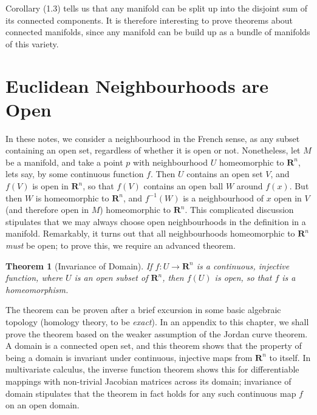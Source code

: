 \documentclass[12pt]{report}
\theoremstyle{plain}
\newtheorem{theorem}{Theorem}[chapter]
\theoremstyle{definition}
\begin{document}
Corollary (1.3) tells us that any manifold can be split up into the disjoint sum of its connected components. It is therefore interesting to prove theorems about connected manifolds, since any manifold can be build up as a bundle of manifolds of this variety.

\section{Euclidean Neighbourhoods are Open}

In these notes, we consider a neighbourhood in the French sense, as any subset containing an open set, regardless of whether it is open or not. Nonetheless, let $M$ be a manifold, and take a point $p$ with neighbourhood $U$ homeomorphic to $\mathbf{R}^n$, lets say, by some continuous function $f$. Then $U$ contains an open set $V$, and $f(V)$ is open in $\mathbf{R}^n$, so that $f(V)$ contains an open ball $W$ around $f(x)$. But then $W$ is homeomorphic to $\mathbf{R}^n$, and $f^{-1}(W)$ is a neighbourhood of $x$ open in $V$ (and therefore open in $M$) homeomorphic to $\mathbf{R}^n$. This complicated discussion stipulates that we may always choose open neighbourhoods in the definition in a manifold. Remarkably, it turns out that all neighbourhoods homeomorphic to $\mathbf{R}^n$ {\it must} be open; to prove this, we require an advanced theorem.


\begin{theorem}[Invariance of Domain]
    If $f:U \to \mathbf{R}^n$ is a continuous, injective function, where $U$ is an open subset of $\mathbf{R}^n$, then $f(U)$ is open, so that $f$ is a homeomorphism.
\end{theorem}

The theorem can be proven after a brief excursion in some basic algebraic topology (homology theory, to be {\it exact}). In an appendix to this chapter, we shall prove the theorem based on the weaker assumption of the Jordan curve theorem. A domain is a connected open set, and this theorem shows that the property of being a domain is invariant under continuous, injective maps from $\mathbf{R}^n$ to itself. In multivariate calculus, the inverse function theorem shows this for differentiable mappings with non-trivial Jacobian matrices across its domain; invariance of domain stipulates that the theorem in fact holds for any such continuous map $f$ on an open domain.
\end{document}
